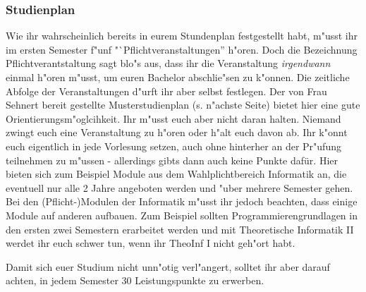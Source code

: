 \subsubsection{Studienplan}
\label{bach_studienplan}
Wie ihr wahrscheinlich bereits in eurem Stundenplan festgestellt habt, m"usst ihr im ersten Semester f"unf "`Pflichtveranstaltungen'' h"oren.
Doch die Bezeichnung Pflichtverantstaltung sagt blo"s aus, dass ihr die Veranstaltung \emph{irgendwann} einmal h"oren m"usst, um euren Bachelor abschlie"sen zu k"onnen.
Die zeitliche Abfolge der Veranstaltungen d"urft ihr aber selbst festlegen.
Der von Frau Sehnert bereit gestellte Musterstudienplan (s. n"achste Seite) bietet hier eine gute Orientierungsm"oglcihkeit.
Ihr m"usst euch aber nicht daran halten. Niemand zwingt euch eine Veranstaltung zu h"oren oder h"alt euch davon ab.
Ihr k"onnt euch eigentlich in jede Vorlesung setzen, auch ohne hinterher an der Pr"ufung teilnehmen zu m"ussen - allerdings gibts dann auch keine Punkte dafür.
Hier bieten sich zum Beispiel Module aus dem Wahlplichtbereich Informatik an, die eventuell nur alle 2 Jahre angeboten werden und "uber mehrere Semester gehen.
Bei den (Pflicht-)Modulen der Informatik m"usst ihr jedoch beachten, dass einige Module auf anderen aufbauen.
Zum Beispiel sollten Programmierengrundlagen in den ersten zwei Semestern erarbeitet werden und mit Theoretische Informatik II werdet ihr euch schwer tun, wenn ihr TheoInf I nicht geh"ort habt.

Damit sich euer Studium nicht unn"otig verl"angert, solltet ihr aber darauf achten, in jedem Semester 30 Leistungspunkte zu erwerben. 


